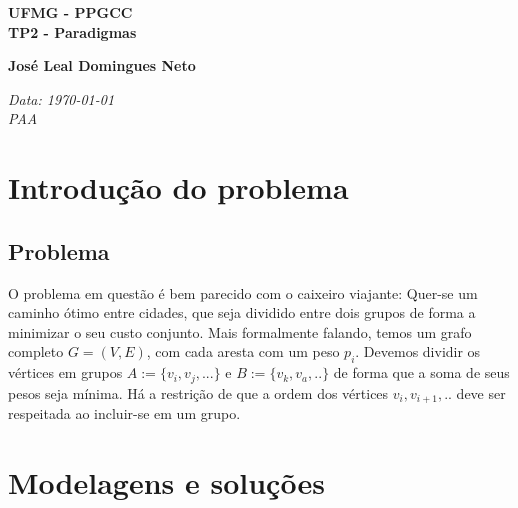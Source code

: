 \documentclass[a4paper,11pt,oneside]{article}
\begin{document}
  \thispagestyle{empty}

  \begin{flushleft}
    \textbf{\huge UFMG - PPGCC}\\
    \vspace*{6mm}
    \textbf{\huge TP2 - Paradigmas}
  \end{flushleft}
  \vspace*{6mm}
  \begin{flushleft}
    \textbf{\large Jos\'e Leal Domingues Neto}\\[2ex]
  \end{flushleft}
  \vspace*{1mm}
  \begin{flushleft}
    \textit{
      Data: \today \\
      PAA}
  \end{flushleft}
  \vspace*{2mm}

\newpage

  \section{Introdu\c{c}\~{a}o do problema}
    \subsection{Problema}
    O problema em quest\~{a}o \'e bem parecido com o caixeiro viajante: Quer-se um caminho \'otimo entre cidades, que seja dividido entre dois grupos de forma a minimizar o seu custo conjunto. Mais formalmente falando, temos um grafo completo \begin{math} G = (V, E) \end{math}, com cada aresta com um peso \begin{math} p_i \end{math}. 
    Devemos dividir os v\'ertices em grupos \begin{math} A := \{ v_i, v_j, ... \} \end{math} e \begin{math} B := \{ v_k, v_a, .. \} \end{math} de forma que a soma de seus pesos seja m\'inima. H\'a a restri\c{c}\~{a}o de que a ordem dos v\'ertices \begin{math} v_i, v_{i+1}, .. \end{math} deve ser respeitada ao incluir-se em um grupo.
  \section{Modelagens e solu\c{c}\~{o}es}
\end{document}
